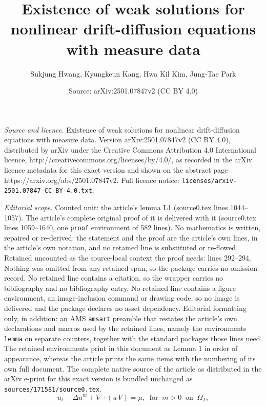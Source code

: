 \documentclass[10pt,a4paper]{amsart}
\title{Existence of weak solutions for nonlinear drift-diffusion equations with measure data}
\author{Sukjung Hwang, Kyungkeun Kang, Hwa Kil Kim, Jung-Tae Park}
\date{Source: arXiv:2501.07847v2 (CC BY 4.0)}
\begin{document}
\maketitle

\noindent\emph{Source and licence.} Existence of weak solutions for nonlinear drift-diffusion equations with measure data. Version arXiv:2501.07847v2 (CC BY 4.0), distributed by arXiv under the Creative Commons Attribution 4.0 International licence, http://creativecommons.org/licenses/by/4.0/, as recorded in the arXiv licence metadata for this exact version and shown on the abstract page https://arxiv.org/abs/2501.07847v2. Full licence notice: \texttt{licenses/arxiv-2501.07847-CC-BY-4.0.txt}.\par\smallskip

\noindent\textit{Editorial scope.} Counted unit: the article's lemma L1 (source0.tex lines 1044--1057). The article's complete original proof of it is delivered with it (source0.tex lines 1059--1640, one \texttt{proof} environment of 582 lines). No mathematics is written, repaired or re-derived: the statement and the proof are the article's own lines, in the article's own notation, and no retained line is substituted or re-flowed.  Retained uncounted as the source-local context the proof needs: lines 292--294.  Nothing was omitted from any retained span, so the package carries no omission record.  No retained line contains a citation, so the wrapper carries no bibliography and no bibliography entry.  No retained line contains a figure environment, an image-inclusion command or drawing code, so no image is delivered and the package declares no asset dependency.  Editorial formatting only, in addition: an AMS \texttt{amsart} preamble that restates the article's own declarations and macros used by the retained lines, namely the environments \texttt{lemma} on separate counters, together with the standard packages those lines need.  The retained environments print in this document as Lemma 1 in order of appearance, whereas the article prints the same items with the numbering of its own full document.  The complete native source of the article as distributed in the arXiv e-print for this exact version is bundled unchanged as \texttt{sources/171581/source0.tex}.
\begin{equation}\label{PME}
	u_t - \Delta u^m + \nabla \cdot \left( u \, V \right)= \mu, \ \text{ for } \  m>0 \ \text{ on } \ \Omega_{T},
\end{equation}
\end{document}
